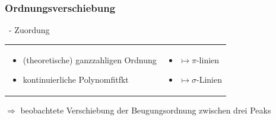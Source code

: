     \subsubsection{Ordnungsverschiebung}
      \begin{myframe}{\subsecname\ - \subsubsecname}
        Zuordung
        \begin{tabular}{p{}p{}}
          \begin{itemize}
            \item (theoretische) ganzzahligen Ordnung
            \item kontinuierliche Polynomfitfkt
          \end{itemize} &
          \begin{itemize}
            \item[] $\mapsto \pi$-linien
            \item[] $\mapsto \sigma$-Linien
          \end{itemize} \\
        \end{tabular}
        $\Rightarrow$ beobachtete Verschiebung der Beugungsordnung zwischen drei Peaks
      \end{myframe}
      
